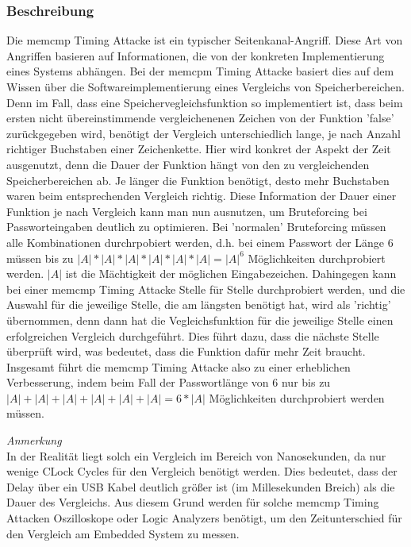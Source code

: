 \documentclass[a4paper,
DIV=13,
12pt,
BCOR=10mm,
department=FakIM,
oneside,
parskip=half,
automark,
listof=totocnumbered,
bibliography=totocnumbered,
acronym=totocnumbered
] {OTHRartcl}
\begin{document}
\subsubsection{Beschreibung}
Die memcmp Timing Attacke ist ein typischer Seitenkanal-Angriff. Diese Art von Angriffen basieren auf Informationen, die von der konkreten Implementierung eines Systems abhängen.
Bei der memcpm Timing Attacke basiert dies auf dem Wissen über die Softwareimplementierung eines Vergleichs von Speicherbereichen.
Denn im Fall, dass eine Speichervegleichsfunktion so implementiert ist, dass beim ersten nicht übereinstimmende vergleichenenen Zeichen von der Funktion 'false' zurückgegeben wird,
benötigt der Vergleich unterschiedlich lange, je nach Anzahl richtiger Buchstaben einer Zeichenkette.
Hier wird konkret der Aspekt der Zeit ausgenutzt, denn die Dauer der Funktion hängt von den zu vergleichenden Speicherbereichen ab.
Je länger die Funktion benötigt, desto mehr Buchstaben waren beim entsprechenden Vergleich richtig.
Diese Information der Dauer einer Funktion je nach Vergleich kann man nun ausnutzen, um Bruteforcing bei Passworteingaben deutlich zu optimieren.
Bei 'normalen' Bruteforcing müssen alle Kombinationen durchrpobiert werden, d.h.
bei einem Passwort der Länge 6 müssen bis zu $|A|*|A|*|A|*|A|*|A|*|A| = |A|^6$ Möglichkeiten durchprobiert werden.
$|A|$ ist die Mächtigkeit der möglichen Eingabezeichen.
Dahingegen kann bei einer memcmp Timing Attacke Stelle für Stelle durchprobiert werden, und die Auswahl für die jeweilige Stelle, die am längsten benötigt hat,
wird als 'richtig' übernommen, denn dann hat die Vegleichsfunktion für die jeweilige Stelle einen erfolgreichen Vergleich durchgeführt.
Dies führt dazu, dass die nächste Stelle überprüft wird, was bedeutet, dass die Funktion dafür mehr Zeit braucht.
Insgesamt führt die memcmp Timing Attacke also zu einer erheblichen Verbesserung, indem beim Fall der Passwortlänge von 6
nur bis zu $ |A|+|A|+|A|+|A|+|A|+|A| = 6 * |A| $ Möglichkeiten durchprobiert werden müssen.

\textit{Anmerkung} \mbox{} \\
In der Realität liegt solch ein Vergleich im Bereich von Nanosekunden, da nur wenige CLock Cycles für den Vergleich benötigt werden.
Dies bedeutet, dass der Delay über ein USB Kabel deutlich größer ist (im Millesekunden Breich) als die Dauer des Vergleichs.
Aus diesem Grund werden für solche memcmp Timing Attacken Oszilloskope oder Logic Analyzers benötigt, um den Zeitunterschied
für den Vergleich am Embedded System zu messen.
\end{document}
